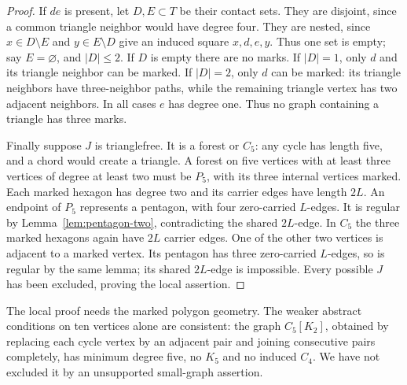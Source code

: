 \documentclass[11pt]{article}
\theoremstyle{remark}
\begin{document}
\begin{proof}
If $de$ is present, let $D,E\subset T$ be their contact sets.
They are disjoint, since a common triangle neighbor would have
degree four. They are nested, since $x\in D\setminus E$ and
$y\in E\setminus D$ give an induced square $x,d,e,y$.
Thus one set is empty; say $E=\varnothing$, and $|D|\le2$.
If $D$ is empty there are no marks. If $|D|=1$, only $d$ and
its triangle neighbor can be marked. If $|D|=2$, only $d$ can
be marked: its triangle neighbors have three-neighbor paths,
while the remaining triangle vertex has two adjacent neighbors.
In all cases $e$ has degree one. Thus no graph containing a
triangle has three marks.

Finally suppose $J$ is trianglefree. It is a forest or $C_5$:
any cycle has length five, and a chord would create a triangle.
A forest on five vertices with at least three vertices of degree
at least two must be $P_5$, with its three internal vertices
marked. Each marked hexagon has degree two and its carrier
edges have length $2L$. An endpoint of $P_5$ represents a
pentagon, with four zero-carried $L$-edges. It is regular by
Lemma~\ref{lem:pentagon-two}, contradicting the shared $2L$-edge.
In $C_5$ the three marked hexagons again have $2L$ carrier
edges. One of the other two vertices is adjacent to a marked
vertex. Its pentagon has three zero-carried $L$-edges, so is
regular by the same lemma; its shared $2L$-edge is impossible.
Every possible $J$ has been excluded, proving the local assertion.
\end{proof}

The local proof needs the marked polygon geometry. The weaker
abstract conditions on ten vertices alone are consistent: the graph
$C_5[K_2]$, obtained by replacing each cycle vertex by an adjacent
pair and joining consecutive pairs completely, has minimum degree
five, no $K_5$ and no induced $C_4$. We have not excluded it by
an unsupported small-graph assertion.
\end{document}

